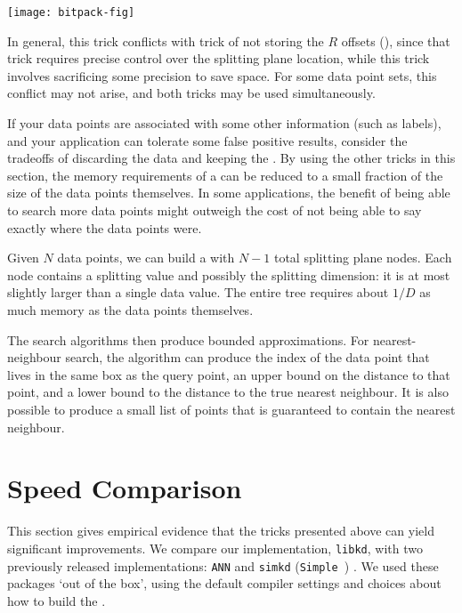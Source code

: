 \nonumberparagraphs
\begin{center}
  \texttt{[image: bitpack-fig]}
\end{center}
\numberparagraphs

In general, this trick conflicts with trick of not storing the $R$
offsets (), since that trick requires precise
control over the splitting plane location, while this trick involves
sacrificing some precision to save space.  For some data point sets,
this conflict may not arise, and both tricks may be used
simultaneously.


If your data points are associated with some other information (such
as labels), and your application can tolerate some false positive
results, consider the tradeoffs of discarding the data and keeping the
\kdtree.  By using the other tricks in this section, the memory
requirements of a \kdtree can be reduced to a small fraction of the
size of the data points themselves.  In some applications, the benefit
of being able to search more data points might outweigh the cost of
not being able to say exactly where the data points were.

Given $N$ data points, we can build a \kdtree with $N-1$ total
splitting plane nodes.  Each node contains a splitting value and
possibly the splitting dimension: it is at most slightly larger than a
single data value.  The entire tree requires about $1/D$ as much
memory as the data points themselves.

The \kdtree search algorithms then produce bounded approximations.
For nearest-neighbour search, the algorithm can produce the index of the
data point that lives in the same box as the query point, an upper bound
on the distance to that point, and a lower bound to the distance to the
true nearest neighbour.  It is also possible to produce a small list of
points that is guaranteed to contain the nearest neighbour.



\section{Speed Comparison}
\label{sec:speed}

This section gives empirical evidence that the tricks presented above
can yield significant improvements.  We compare our implementation,
{\tt libkd}, with two previously released \kdtree implementations:
{\tt ANN} \cite{arya1998} and {\tt simkd} ({\tt Simple \kdtrees})
\cite{simkd}.  We used these packages `out of the box', using the default compiler settings
and choices about how to build the \kdtree.

